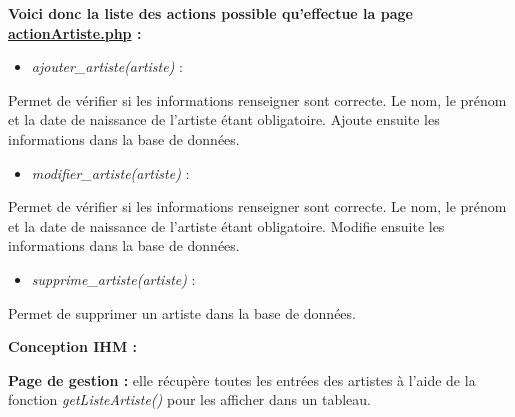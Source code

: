 			\begin{paragraphe}
                \textbf{Voici donc la liste des actions possible qu'effectue la page \underline{actionArtiste.php} :}
            
                \begin{itemize}
                    \item \emph{ajouter\_artiste(artiste)} :
                \end{itemize}
                \begin{paragraphe}
                    Permet de vérifier si les informations renseigner sont correcte. Le nom, le prénom et la date de naissance de l'artiste étant obligatoire. Ajoute ensuite les informations dans la base de données.
                \end{paragraphe}
                
                \begin{itemize}
                    \item \emph{modifier\_artiste(artiste)} :
                \end{itemize}
                \begin{paragraphe}
                    Permet de vérifier si les informations renseigner sont correcte. Le nom, le prénom et la date de naissance de l'artiste étant obligatoire. Modifie ensuite les informations dans la base de données.
                \end{paragraphe}
                
                \begin{itemize}
                    \item \emph{supprime\_artiste(artiste)} :
                \end{itemize}
                \begin{paragraphe}
                    Permet de supprimer un artiste dans la base de données.
                \end{paragraphe}
            \end{paragraphe}

			\begin{paragraphe}
				\textbf{Conception IHM :}
			\end{paragraphe}
            
            \begin{paragraphe}
                \textbf{Page de gestion :} elle récupère toutes les entrées des artistes à l'aide de la fonction \emph{getListeArtiste()} pour les afficher dans un tableau.
            \end{paragraphe}

